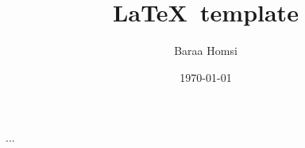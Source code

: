 \documentclass[a4paper, twocolumn]{article}
\title{\LaTeX\ template}
\date{1970-01-01}
\author{Baraa Homsi}
\begin{document}
\maketitle

...

\printbibliography
\end{document}
